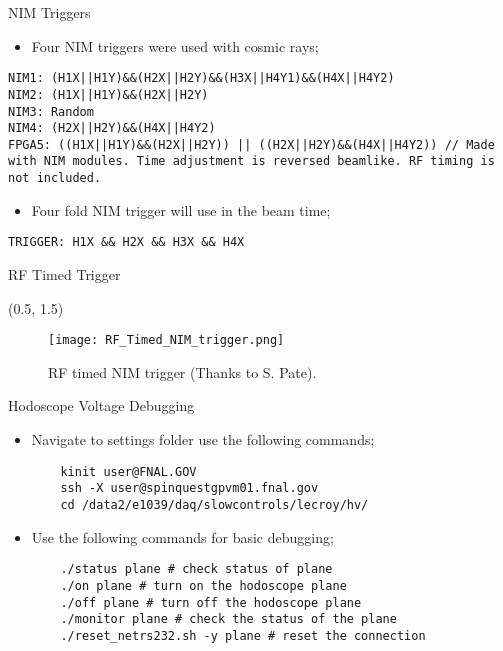 \documentclass[10pt, xcolor={dvipsnames}, aspectratio = 169, sans,mathserif]{beamer}
\begin{document}
\begin{frame}[fragile]{NIM Triggers}

\begin{itemize}
    \item Four NIM triggers were used with cosmic rays;
\end{itemize}

\begin{verbatim}
NIM1: (H1X||H1Y)&&(H2X||H2Y)&&(H3X||H4Y1)&&(H4X||H4Y2)
NIM2: (H1X||H1Y)&&(H2X||H2Y)
NIM3: Random
NIM4: (H2X||H2Y)&&(H4X||H4Y2)
FPGA5: ((H1X||H1Y)&&(H2X||H2Y)) || ((H2X||H2Y)&&(H4X||H4Y2)) // Made
with NIM modules. Time adjustment is reversed beamlike. RF timing is
not included.
\end{verbatim}

\begin{itemize}
    \item Four fold NIM trigger will use in the beam time;
\end{itemize}

\begin{verbatim}
TRIGGER: H1X && H2X && H3X && H4X
\end{verbatim}

\end{frame}

\begin{frame}{RF Timed Trigger}

\begin{textblock}{14.0}(0.5, 1.5)
\begin{figure}
    \centering
    \texttt{[image: RF\_Timed\_NIM\_trigger.png]}
    \caption{RF timed NIM trigger (Thanks to S. Pate).}
\end{figure}
\end{textblock}

\end{frame}

\begin{frame}[fragile]{Hodoscope Voltage Debugging}

\begin{itemize}

    \item Navigate to settings folder use the following commands;

    \begin{verbatim}
    kinit user@FNAL.GOV
    ssh -X user@spinquestgpvm01.fnal.gov
    cd /data2/e1039/daq/slowcontrols/lecroy/hv/
    \end{verbatim}

    \item Use the following commands for basic debugging;

    \begin{verbatim}
    ./status plane # check status of plane
    ./on plane # turn on the hodoscope plane
    ./off plane # turn off the hodoscope plane
    ./monitor plane # check the status of the plane
    ./reset_netrs232.sh -y plane # reset the connection
    \end{verbatim}

\end{itemize}

\end{frame}
\end{document}
